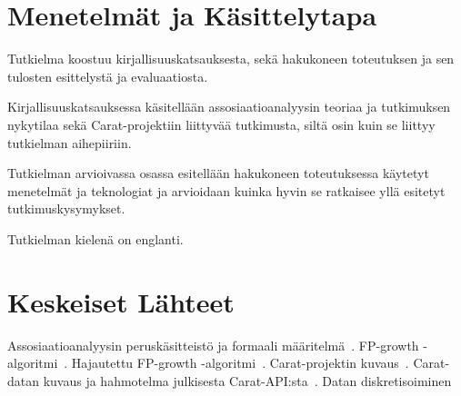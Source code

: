 \documentclass[finnish]{tktltiki2}
\theoremstyle{definition}
\theoremstyle{remark}
\begin{document}
\section*{Menetelmät ja Käsittelytapa}

Tutkielma koostuu kirjallisuuskatsauksesta, sekä hakukoneen toteutuksen ja sen tulosten esittelystä ja evaluaatiosta.

Kirjallisuuskatsauksessa käsitellään assosiaatioanalyysin teoriaa ja tutkimuksen nykytilaa sekä Carat-projektiin liittyvää tutkimusta, siltä osin kuin se liittyy tutkielman aihepiiriin.

Tutkielman arvioivassa osassa esitellään hakukoneen toteutuksessa käytetyt menetelmät ja teknologiat ja arvioidaan kuinka hyvin se ratkaisee yllä esitetyt tutkimuskysymykset.

Tutkielman kielenä on englanti.    

\section*{Keskeiset Lähteet}

Assosiaatioanalyysin peruskäsitteistö ja formaali määritelmä~\cite{Agrawal:1993:MAR:170036.170072}. FP-growth -algoritmi~\cite{Han:2000:MFP:335191.335372}. Hajautettu FP-growth -algoritmi~\cite{Li:2008:PPF:1454008.1454027}. Carat-projektin kuvaus~\cite{Oliner:2013:CCE:2517351.2517354}. Carat-datan kuvaus ja hahmotelma julkisesta Carat-API:sta~\cite{7840871}. Datan diskretisoiminen~\cite{Webb:2001:DAN:502512.502569,Lud2000}


%
%
% 
%







% 
\end{document}
